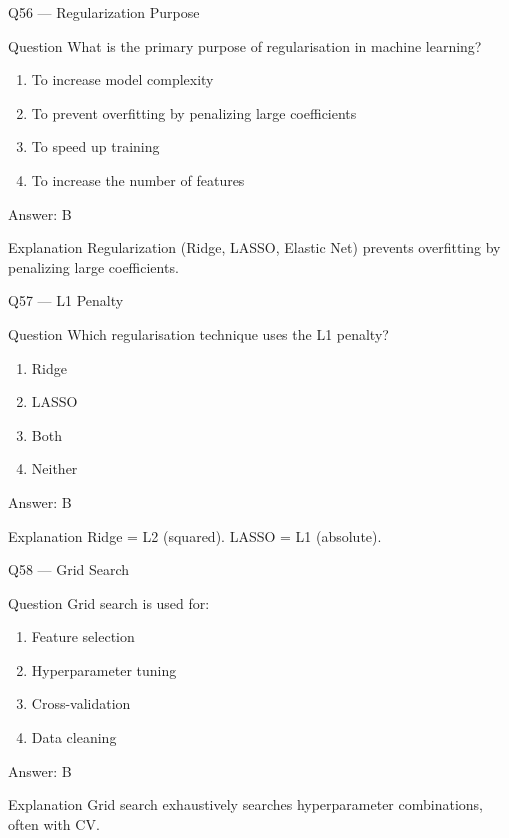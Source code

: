\documentclass[aspectratio=169,8pt]{beamer}
\begin{document}
	\begin{frame}{Q56 --- Regularization Purpose}
		\begin{block}{Question}
			What is the primary purpose of regularisation in machine learning?
		\end{block}
		\begin{enumerate}
			\item To increase model complexity
			\item To prevent overfitting by penalizing large coefficients
			\item To speed up training
			\item To increase the number of features
		\end{enumerate}
		\begin{exampleblock}{Answer: B}\end{exampleblock}
		\begin{block}{Explanation}
			Regularization (Ridge, LASSO, Elastic Net) prevents overfitting by penalizing large coefficients.
		\end{block}
	\end{frame}
	
	\begin{frame}{Q57 --- L1 Penalty}
		\begin{block}{Question}
			Which regularisation technique uses the L1 penalty?
		\end{block}
		\begin{enumerate}
			\item Ridge
			\item LASSO
			\item Both
			\item Neither
		\end{enumerate}
		\begin{exampleblock}{Answer: B}\end{exampleblock}
		\begin{block}{Explanation}
			Ridge = L2 (squared). LASSO = L1 (absolute).
		\end{block}
	\end{frame}
	
	\begin{frame}{Q58 --- Grid Search}
		\begin{block}{Question}
			Grid search is used for:
		\end{block}
		\begin{enumerate}
			\item Feature selection
			\item Hyperparameter tuning
			\item Cross-validation
			\item Data cleaning
		\end{enumerate}
		\begin{exampleblock}{Answer: B}\end{exampleblock}
		\begin{block}{Explanation}
			Grid search exhaustively searches hyperparameter combinations, often with CV.
		\end{block}
	\end{frame}
	
\end{document}
